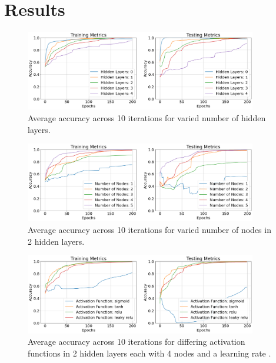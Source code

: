 \documentclass[12pt]{article}
\begin{document}
\section{Results}

\begin{figure}[H]
  \centering
  \includegraphics[width=0.9\textwidth]{figs/layers.png}
  \caption{
    Average accuracy across 10 iterations for varied number of hidden
    layers.
  }
  \label{fig:layers}
\end{figure}

\begin{figure}[H]
  \centering
  \includegraphics[width=0.9\textwidth]{figs/nodes.png}
  \caption{
    Average accuracy across 10 iterations for varied number of nodes
    in 2 hidden layers.
  }
  \label{fig:nodes}
\end{figure}

\begin{figure}[H]
  \centering
  \includegraphics[width=0.9\textwidth]{figs/funcs.png}
  \caption{
    Average accuracy across 10 iterations for differing activation
    functions in 2 hidden layers each with 4 nodes and a learning rate
     .
  }
  \label{fig:funcs}
\end{figure}
\end{document}
